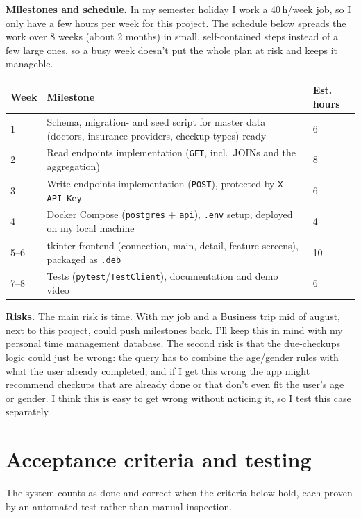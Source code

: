 \documentclass[11pt,a4paper]{article}
\begin{document}
\textbf{Milestones and schedule.} In my semester holiday I work a 40\,h/week job, so I only have a
few hours per week for this project. The schedule below spreads the work over
8 weeks (about 2 months) in small, self-contained steps instead of a few large
ones, so a busy week doesn't put the whole plan at risk and keeps it manageble.

\renewcommand{\arraystretch}{1.2}
\begin{tabularx}{\linewidth}{@{}p{1.4cm}Xp{1.8cm}@{}}
\toprule
\textbf{Week} & \textbf{Milestone} & \textbf{Est. hours} \\
\midrule
1     & Schema, migration- and seed script for master data (doctors, insurance providers, checkup types) ready & 6 \\
2     & Read endpoints implementation (\texttt{GET}, incl.\ JOINs and the aggregation) & 8 \\
3     & Write endpoints implementation (\texttt{POST}), protected by \texttt{X-API-Key} & 6 \\
4     & Docker Compose (\texttt{postgres} + \texttt{api}), \texttt{.env} setup, deployed on my local machine & 4 \\
5--6  & tkinter frontend (connection, main, detail, feature screens), packaged as \texttt{.deb} & 10 \\
7--8  & Tests (\texttt{pytest}/\texttt{TestClient}), documentation and demo video & 6 \\
\bottomrule
\end{tabularx}

\textbf{Risks.} The main risk is time. With my job and a Business trip mid of august,
next to this project, could push milestones back. I'll keep this in mind with my
personal time management database. The second risk is that the due-checkups logic could just be wrong: the query
has to combine the age/gender rules with what the user already completed, and
if I get this wrong the app might recommend checkups that are already done or
that don't even fit the user's age or gender. I think this is easy to get
wrong without noticing it, so I test this case separately.

\newpage
\section{Acceptance criteria and testing}

The system counts as done and correct when the criteria below hold, each
proven by an automated test rather than manual inspection.
\end{document}
